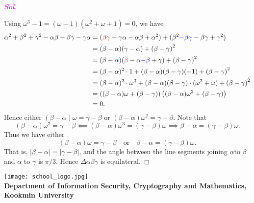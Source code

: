 \documentclass{article}
\newcommand{\footer}[1]{
\begin{flushright}
	\vspace{2em}
	\texttt{[image: school\_logo.jpg]} \\
	\vspace{1em}
	\textcolor{blue2}{\small\textbf{#1}}
\end{flushright}
}
\theoremstyle{definition}
\newcommand{\of}[1]{\left( #1 \right)}
\newcommand{\abs}[1]{\left\lvert #1 \right\rvert}
\newcommand{\sol}{\textcolor{magenta}{\bf Sol}}
\begin{document}
\begin{enumerate}
\begin{proof}[\sol]
\begin{center}
		\end{center}
		Using $\omega^3-1=(\omega-1)\of{\omega^2+\omega+1}=0$, we have \begin{align*}
			\alpha^2+\beta^2+\gamma^2-\alpha\beta-\beta\gamma-\gamma\alpha&=(\textcolor{red}{\beta\gamma} - \gamma\alpha - \alpha\beta + \alpha^2) + (\beta^2\textcolor{blue}{-\beta\gamma} -\beta\gamma + \gamma^2)\\
			&=(\beta-\alpha)(\gamma-\alpha)+\of{\beta-\gamma}^2\\
			&=(\beta-\alpha)(\textcolor{red}{\beta}-\alpha\textcolor{blue}{-\beta}+\gamma)+\of{\beta-\gamma}^2\\
			&=(\beta-\alpha)^2\cdot 1+(\beta-\alpha)(\beta-\gamma)(-1)+\of{\beta-\gamma}^2\\
			&=(\beta-\alpha)^2\cdot\omega^3+(\beta-\alpha)(\beta-\gamma)\cdot(\omega^2+\omega)+\of{\beta-\gamma}^2\\
			&=\of{(\beta-\alpha)\omega+(\beta-\gamma)}\of{(\beta-\alpha)\omega^2+(\beta-\gamma)}\\
			&=0.
		\end{align*} Hence either $\of{\beta-\alpha}\omega=\gamma-\beta$ or $\of{\beta-\alpha}\omega^2=\gamma-\beta$. Note that \[
		\of{\beta-\alpha}\omega^2=\gamma-\beta\impliedby\of{\beta-\alpha}\omega^3=\of{\gamma-\beta}\omega\implies\beta-\alpha=\of{\gamma-\beta}\omega.
		\] Thus we have either \[
		\of{\beta-\alpha}\omega=\gamma-\beta\quad\text{or}\quad\beta-\alpha=\of{\gamma-\beta}\omega.
		\] That is, $\abs{\beta-\alpha}=\abs{\gamma-\beta}$, and the angle between the line segments joining $\alpha$to $\beta$ and $
		\alpha$ to $\gamma$ is $\pi/3$. Hence $\Delta\alpha\beta\gamma$ is equilateral.
	\end{proof}
\end{enumerate}


\footer{Department of Information Security, Cryptography and Mathematics, Kookmin University}
\end{document}
